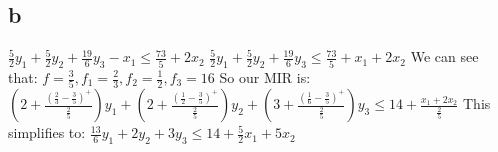 \documentclass[10pt, letterpaper]{paper}
\begin{document}
\subsection*{b}
$\frac{5}{2}y_1 + \frac{5}{2} y_2 + \frac{19}{6}y_3 - x_1 \leq \frac{73}{5} + 2x_2$
\newline
$\frac{5}{2}y_1 + \frac{5}{2} y_2 + \frac{19}{6}y_3 \leq \frac{73}{5} + x_1 + 2x_2 $
\newline
We can see that: $f = \frac{3}{5}, f_1 = \frac{2}{3}, f_2 = \frac{1}{2}, f_3 = {1}{6}$
\newline
So our MIR is: $(2+\frac{(\frac{2}{3} - \frac{3}{5})^+}{\frac{2}{5}})y_1 + (2+\frac{(\frac{1}{2}-\frac{3}{5})^+}{\frac{2}{5}})y_2 + (3 + \frac{(\frac{1}{6} - \frac{3}{5})^+}{\frac{2}{5}})y_3 \leq 14 + \frac{x_1 + 2x_2}{\frac{2}{5}}$
\newline
This simplifies to: $\frac{13}{6} y_1 + 2y_2 + 3y_3 \leq 14 + \frac{5}{2}x_1 + 5x_2$
\end{document}
